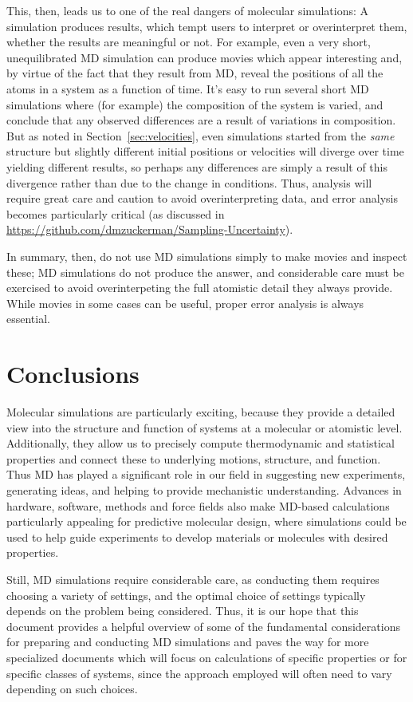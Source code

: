 \documentclass[9pt,bestpractices]{livecoms}
\begin{document}
This, then, leads us to one of the real dangers of molecular simulations: A simulation produces results, which tempt users to interpret or overinterpret them, whether the results are meaningful or not.
For example, even a very short, unequilibrated MD simulation can produce movies which appear interesting and, by virtue of the fact that they result from MD, reveal the positions of all the atoms in a system as a function of time. 
It's easy to run several short MD simulations where (for example) the composition of the system is varied, and conclude that any observed differences are a result of variations in composition.
But as noted in Section~\ref{sec:velocities}, even simulations started from the \emph{same} structure but slightly different initial positions or velocities will diverge over time yielding different results, so perhaps any differences are simply a result of this divergence rather than due to the change in conditions.
Thus, analysis will require great care and caution to avoid overinterpreting data, and error analysis becomes particularly critical (as discussed in \url{https://github.com/dmzuckerman/Sampling-Uncertainty}).

In summary, then, do not use MD simulations simply to make movies and inspect these; MD simulations do not produce the answer, and considerable care must be exercised to avoid overinterpeting the full atomistic detail they always provide. 
While movies in some cases can be useful, proper error analysis is always essential.



\section{Conclusions}
Molecular simulations are particularly exciting, because they provide a detailed view into the structure and function of systems at a molecular or atomistic level.
Additionally, they allow us to precisely compute thermodynamic and statistical properties and connect these to underlying motions, structure, and function.
Thus MD has played a significant role in our field in suggesting new experiments, generating ideas, and helping to provide mechanistic understanding.
Advances in hardware, software, methods and force fields also make MD-based calculations particularly appealing for predictive molecular design, where simulations could be used to help guide experiments to develop materials or molecules with desired properties.

Still, MD simulations require considerable care, as conducting them requires choosing a variety of settings, and the optimal choice of settings typically depends on the problem being considered.
Thus, it is our hope that this document provides a helpful overview of some of the fundamental considerations for preparing and conducting MD simulations and paves the way for more specialized documents which will focus on calculations of specific properties or for specific classes of systems, since the approach employed will often need to vary depending on such choices.
\end{document}
